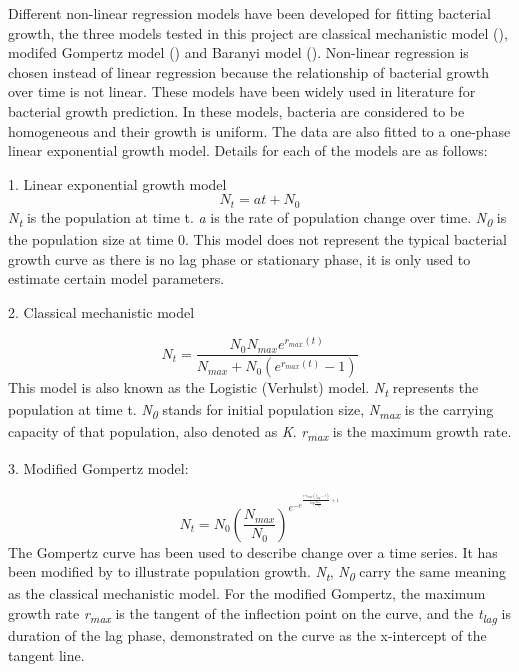 \documentclass[11pt]{article}
\begin{document}
Different non-linear regression models have been developed for fitting bacterial growth, the three models tested in this project are classical mechanistic model (\citealt{verhulst1838notice}), modifed Gompertz model (\citealt{PMID:16348228}) and Baranyi model (\citealt{BARANYI1994277}). Non-linear regression is chosen instead of linear regression because the relationship of bacterial growth over time is not linear. These models have been widely used in literature for bacterial growth prediction. In these models, bacteria are considered to be homogeneous and their growth is uniform. The data are also fitted to a one-phase linear exponential growth model. Details for each of the models are as follows:

1. Linear exponential growth model
\begin{equation}
    N_{t} = at + N_{0}
\end{equation}
\emph{N\textsubscript{t}} is the population at time t. \emph{a} is the rate of population change over time. \emph{N\textsubscript{0}} is the population size at time 0. This model does not represent the typical bacterial growth curve as there is no lag phase or stationary phase, it is only used to estimate certain model parameters. 

2. Classical mechanistic model

\begin{equation}
    N_{t} = \frac{N_{0} N_{max}  e^{r_{max}(t)}} {N_{max} + N_{0}  (e^{r_{max}(t)} - 1)}
\end{equation}
This model is also known as the Logistic (Verhulst) model. \emph{N\textsubscript{t}} represents the population at time t.  \emph{N\textsubscript{0}} stands for initial population size,  \emph{N\textsubscript{max}} is the carrying capacity of that population, also denoted as \emph{K}. \emph{r\textsubscript{max}} is the maximum growth rate. 

3. Modified Gompertz model:

\begin{equation}
    N_{t} = N_{0}(\frac{N_{max}}{N_{0}}) ^ {e ^ {-e ^ {\frac{e ^1 r_{max}(t_{lag} - t)}{log\frac{N_{max}}{N_{0}}} + 1}}}
\end{equation}
The Gompertz curve has been used to describe change over a time series. It has been modified by \citealt{PMID:16348228} to illustrate population growth. \emph{N\textsubscript{t}}, \emph{N\textsubscript{0}} carry the same meaning as the classical mechanistic model. For the modified Gompertz, the maximum growth rate \emph{r\textsubscript{max}} is the tangent of the inflection point on the curve, and the \emph{t\textsubscript{lag}} is duration of the lag phase, demonstrated on the curve as the x-intercept of the tangent line. 
\end{document}
